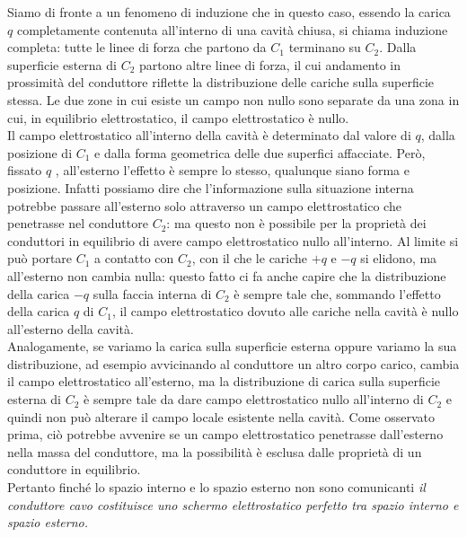 Siamo di fronte a un fenomeno di induzione che in questo caso, essendo la carica $q$ completamente contenuta all'interno di una  cavità chiusa, si chiama induzione completa: tutte le linee di forza che partono da $C_1$ terminano su $C_2$. Dalla superficie esterna di $C_2$ partono altre linee di forza, il cui andamento in prossimità del conduttore riflette la distribuzione delle cariche sulla superficie stessa. Le due zone in cui esiste un campo non nullo sono separate da una zona in cui, in equilibrio elettrostatico, il campo elettrostatico è nullo.\\

Il campo elettrostatico all'interno della cavità è determinato dal valore di $q$, dalla posizione di $C_1$ e dalla forma geometrica delle due superfici affacciate. Però, fissato $q$ , all'esterno l'effetto è sempre lo stesso, qualunque siano forma e posizione. Infatti possiamo dire che l'informazione sulla situazione interna potrebbe passare all'esterno solo attraverso un campo elettrostatico che penetrasse nel conduttore $C_2$: ma questo non è possibile per la proprietà dei conduttori in equilibrio di avere campo elettrostatico nullo all'interno. Al limite si può portare $C_1$ a contatto con $C_2$, con il che le cariche $+q$ e $-q$ si elidono, ma all'esterno non cambia nulla: questo fatto ci fa anche capire che la distribuzione della carica $-q$ sulla faccia interna di $C_2$ è sempre tale che, sommando l'effetto della carica $q$ di $C_1$, il campo elettrostatico dovuto alle cariche nella cavità è nullo all'esterno della cavità.\\

Analogamente, se variamo la carica sulla superficie esterna oppure variamo la sua distribuzione, ad esempio avvicinando al conduttore un altro corpo carico, cambia il campo elettrostatico all'esterno, ma la distribuzione di carica sulla superficie esterna di $C_2$ è sempre tale da dare campo elettrostatico nullo all'interno di $C_2$ e quindi non può alterare il campo locale esistente nella cavità. Come osservato prima, ciò potrebbe avvenire se un campo elettrostatico penetrasse dall'esterno nella massa del conduttore, ma la possibilità è esclusa dalle proprietà di un conduttore in equilibrio.\\

Pertanto finché lo spazio interno e lo spazio esterno non sono comunicanti \emph{il conduttore cavo costituisce uno schermo elettrostatico perfetto tra spazio interno e spazio esterno.}\\

